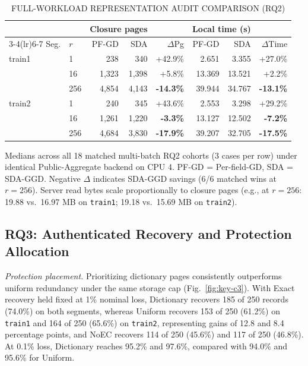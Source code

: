 \documentclass[10pt,journal]{IEEEtran}
\newcommand{\tabnote}[1]{\par\smallskip\parbox{\linewidth}{\footnotesize #1}}
\begin{document}
\begin{table}[t]\centering\small
\caption{FULL-WORKLOAD REPRESENTATION AUDIT COMPARISON (RQ2)}
\label{tab:c2-rep-full}
\setlength{\tabcolsep}{3.0pt}
\begin{tabular}{@{}llrrrrrr@{}}\toprule
& & \multicolumn{2}{c}{Closure pages} & & \multicolumn{2}{c}{Local time (s)} & \\
\cmidrule(lr){3-4}\cmidrule(lr){6-7}
Seg. & $r$ & PF-GD & SDA & $\Delta$Pg & PF-GD & SDA & $\Delta$Time\\\midrule
train1 & 1 & 238 & 340 & +42.9\% & 2.651 & 3.355 & +27.0\%\\
 & 16 & 1,323 & 1,398 & +5.8\% & 13.369 & 13.521 & +2.2\%\\
 & 256 & 4,854 & 4,143 & \textbf{-14.3\%} & 39.944 & 34.767 & \textbf{-13.1\%}\\\midrule
train2 & 1 & 240 & 345 & +43.6\% & 2.553 & 3.298 & +29.2\%\\
 & 16 & 1,261 & 1,220 & \textbf{-3.3\%} & 13.127 & 12.502 & \textbf{-7.2\%}\\
 & 256 & 4,684 & 3,830 & \textbf{-17.9\%} & 39.207 & 32.705 & \textbf{-17.5\%}\\\bottomrule
\end{tabular}
\tabnote{Medians across all 18 matched multi-batch RQ2 cohorts (3 cases per row) under identical Public-Aggregate backend on CPU 4. PF-GD = Per-field-GD, SDA = SDA-GGD. Negative $\Delta$ indicates SDA-GGD savings (6/6 matched wins at $r=256$). Server read bytes scale proportionally to closure pages (e.g., at $r=256$: 19.88 vs.\ 16.97 MB on \texttt{train1}; 19.18 vs.\ 15.69 MB on \texttt{train2}).}
\end{table}

\subsection{RQ3: Authenticated Recovery and Protection Allocation}
\emph{Protection placement.}
Prioritizing dictionary pages consistently outperforms uniform redundancy under the same storage cap (Fig.~\ref{fig:key-c3}). With Exact recovery held fixed at 1\% nominal loss, Dictionary recovers 185 of 250 records (74.0\%) on both segments, whereas Uniform recovers 153 of 250 (61.2\%) on \texttt{train1} and 164 of 250 (65.6\%) on \texttt{train2}, representing gains of 12.8 and 8.4 percentage points, and NoEC recovers 114 of 250 (45.6\%) and 117 of 250 (46.8\%). At 0.1\% loss, Dictionary reaches 95.2\% and 97.6\%, compared with 94.0\% and 95.6\% for Uniform.
\end{document}
